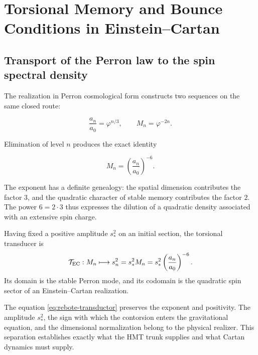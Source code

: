 \chapter{Torsional Memory and Bounce Conditions in Einstein--Cartan}
\label{ch:rebote-ec}

\section{Transport of the Perron law to the spin spectral density}

The realization in Perron cosmological form constructs two sequences on the
same closed route:

\begin{equation}
 \frac{a_n}{a_0}=\varphi^{n/3},
 \qquad
 M_n=\varphi^{-2n}.
 \label{eq:rebote-perron-pair}
\end{equation}

Elimination of level \(n\) produces the exact identity

\begin{equation}
 \boxed{M_n=\left(\frac{a_n}{a_0}\right)^{-6}.}
 \label{eq:rebote-memory-six}
\end{equation}

The exponent has a definite genealogy: the spatial dimension
contributes the factor \(3\), and the quadratic character of stable memory
contributes the factor \(2\).  The power \(6=2\cdot3\) thus expresses the dilution
of a quadratic density associated with an extensive spin charge.

\begin{definition}
Having fixed a positive amplitude \(s_*^2\) on an initial section, the torsional
transducer is
\begin{equation}
 \mathcal T_{\rm EC}:M_n\longmapsto
 s_n^2=s_*^2M_n
 =s_*^2\left(\frac{a_n}{a_0}\right)^{-6}.
 \label{eq:rebote-transductor}
\end{equation}
Its domain is the stable Perron mode, and its codomain is the
quadratic spin sector of an Einstein--Cartan realization.
\end{definition}

The equation \cref{eq:rebote-transductor} preserves the exponent and
positivity.  The amplitude \(s_*^2\), the sign with which the contorsion enters
the gravitational equation, and the dimensional normalization belong to the
physical realizer.  This separation establishes exactly what the
HMT trunk supplies and what Cartan dynamics must supply.

